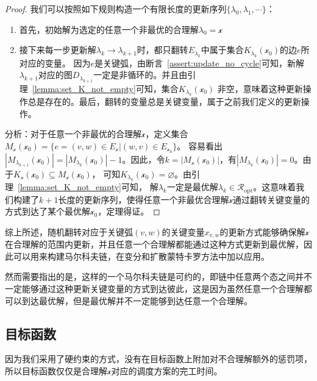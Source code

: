 \begin{proof}
    我们可以按照如下规则构造一个有限长度的更新序列$\{\mathcal{\lambda}_{0}, \mathcal{\lambda}_{1}, \cdots\}$：
    \begin{enumerate}
        \item 首先，初始解为选定的任意一个非最优的合理解$\mathcal{\lambda}_{0}=\mathcal{x}$
        \item 接下来每一步更新解$\mathcal{\lambda}_{k} \rightarrow \mathcal{\lambda}_{k+1}$时，都只翻转$E_{\mathcal{\lambda}_{k}}$中属于集合$K_{\mathcal{\lambda}_k}(\mathcal{x}_0)$的边$e$所对应的变量。
        因为$e$是关键弧，由断言~\ref{assert:update_no_cycle}可知，新解$\mathcal{\lambda}_{k+1}$对应的图$D_{\lambda_{k+1}}$一定是非循环的。并且由引理~\ref{lemma:set_K_not_empty}可知，集合$K_{\mathcal{\lambda}_k}(\mathcal{x}_0)$
        非空，意味着这种更新操作总是存在的。最后，翻转的变量总是关键变量，属于之前我们定义的更新操作。
    \end{enumerate}

    分析：对于任意一个非最优的合理解$\mathcal{x}$，定义集合$M_{\mathcal{x}}(\mathcal{x_0})=\{e=(v,w)\in E_{\mathcal{x}}|(w,v)\in E_{\mathcal{x_0}}\}$。
    容易看出$|M_{\mathcal{\lambda}_{k+1}}(\mathcal{x}_0)|=|M_{\mathcal{\lambda}_{k}}(\mathcal{x}_0)|-1$。因此，令$k=|M_{\mathcal{x}}(\mathcal{x}_0)|$，有$|M_{\mathcal{\lambda}_{k}}(\mathcal{x}_0)|=0$。由于$K_{\mathcal{x}}(\mathcal{x}_0)\subseteq M_{\mathcal{x}}(\mathcal{x_0})$，
    可知$K_{\mathcal{\lambda}_{k}}(\mathcal{x}_0)=\varnothing$。由引理~\ref{lemma:set_K_not_empty}可知，
    解$\mathcal{\lambda}_{k}$一定是最优解$\mathcal{\lambda}_{k}\in\mathscr{R}_\text{opt}$。这意味着我们构建了$k+1$长度的更新序列，使得任意一个非最优合理解$\mathcal{x}$通过翻转关键变量的方式到达了某个最优解$\mathcal{x}_0$，定理得证。
\end{proof}

综上所述，随机翻转对应于关键弧$(v,w)$的关键变量$x_{v,w}$的更新方式能够确保解$\mathcal{x}$在合理解的范围内更新，并且任意一个合理解都能通过这种方式更新到最优解，因此可以用来构建马尔科夫链，在变分和扩散蒙特卡罗方法中加以应用。

然而需要指出的是，这样的一个马尔科夫链是可约的，即链中任意两个态之间并不一定能够通过这种更新关键变量的方式到达彼此，这是因为虽然任意一个合理解都可以到达最优解，但是最优解并不一定能够到达任意一个合理解。

\subsection{目标函数}
因为我们采用了硬约束的方式，没有在目标函数上附加对不合理解额外的惩罚项，所以目标函数仅仅是合理解$\mathcal{x}$对应的调度方案的完工时间。

